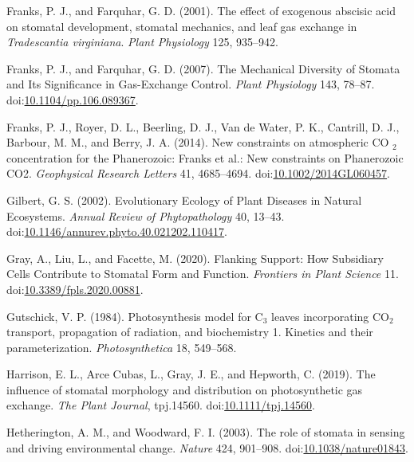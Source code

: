 \documentclass[utf8]{frontiersSCNS}
\begin{document}
\leavevmode\hypertarget{ref-franks_effect_2001}{}%
Franks, P. J., and Farquhar, G. D. (2001). The effect of exogenous
abscisic acid on stomatal development, stomatal mechanics, and leaf gas
exchange in \emph{Tradescantia virginiana}. \emph{Plant Physiology} 125,
935--942.

\leavevmode\hypertarget{ref-franks_mechanical_2007}{}%
Franks, P. J., and Farquhar, G. D. (2007). The Mechanical Diversity of
Stomata and Its Significance in Gas-Exchange Control. \emph{Plant
Physiology} 143, 78--87.
doi:\href{https://doi.org/10.1104/pp.106.089367}{10.1104/pp.106.089367}.

\leavevmode\hypertarget{ref-franks_new_2014}{}%
Franks, P. J., Royer, D. L., Beerling, D. J., Van de Water, P. K.,
Cantrill, D. J., Barbour, M. M., and Berry, J. A. (2014). New
constraints on atmospheric CO \(_{\textrm{2}}\) concentration for the
Phanerozoic: Franks et al.: New constraints on Phanerozoic CO2.
\emph{Geophysical Research Letters} 41, 4685--4694.
doi:\href{https://doi.org/10.1002/2014GL060457}{10.1002/2014GL060457}.

\leavevmode\hypertarget{ref-gilbert_evolutionary_2002}{}%
Gilbert, G. S. (2002). Evolutionary Ecology of Plant Diseases in Natural
Ecosystems. \emph{Annual Review of Phytopathology} 40, 13--43.
doi:\href{https://doi.org/10.1146/annurev.phyto.40.021202.110417}{10.1146/annurev.phyto.40.021202.110417}.

\leavevmode\hypertarget{ref-gray_flanking_2020}{}%
Gray, A., Liu, L., and Facette, M. (2020). Flanking Support: How
Subsidiary Cells Contribute to Stomatal Form and Function.
\emph{Frontiers in Plant Science} 11.
doi:\href{https://doi.org/10.3389/fpls.2020.00881}{10.3389/fpls.2020.00881}.

\leavevmode\hypertarget{ref-gutschick_photosynthesis_1984}{}%
Gutschick, V. P. (1984). Photosynthesis model for C\(_{\textrm{3}}\)
leaves incorporating CO\(_{\textrm{2}}\) transport, propagation of
radiation, and biochemistry 1. Kinetics and their parameterization.
\emph{Photosynthetica} 18, 549--568.

\leavevmode\hypertarget{ref-harrison_influence_2019}{}%
Harrison, E. L., Arce Cubas, L., Gray, J. E., and Hepworth, C. (2019).
The influence of stomatal morphology and distribution on photosynthetic
gas exchange. \emph{The Plant Journal}, tpj.14560.
doi:\href{https://doi.org/10.1111/tpj.14560}{10.1111/tpj.14560}.

\leavevmode\hypertarget{ref-hetherington_role_2003}{}%
Hetherington, A. M., and Woodward, F. I. (2003). The role of stomata in
sensing and driving environmental change. \emph{Nature} 424, 901--908.
doi:\href{https://doi.org/10.1038/nature01843}{10.1038/nature01843}.
\end{document}
